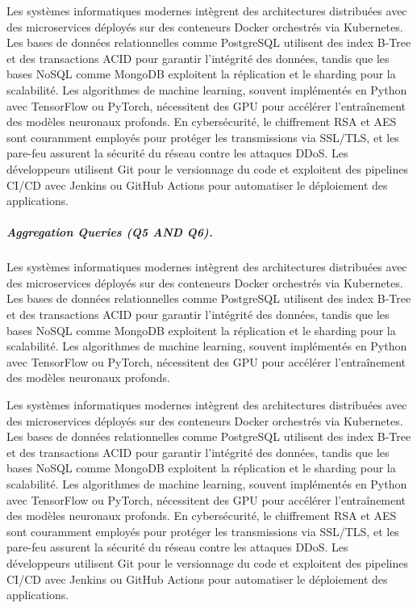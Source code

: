



Les systèmes informatiques modernes intègrent des architectures distribuées avec des microservices déployés sur des conteneurs Docker orchestrés via Kubernetes. Les bases de données relationnelles comme PostgreSQL utilisent des index B-Tree et des transactions ACID pour garantir l'intégrité des données, tandis que les bases NoSQL comme MongoDB exploitent la réplication et le sharding pour la scalabilité. Les algorithmes de machine learning, souvent implémentés en Python avec TensorFlow ou PyTorch, nécessitent des GPU pour accélérer l'entraînement des modèles neuronaux profonds. En cybersécurité, le chiffrement RSA et AES sont couramment employés pour protéger les transmissions via SSL/TLS, et les pare-feu assurent la sécurité du réseau contre les attaques DDoS. Les développeurs utilisent Git pour le versionnage du code et exploitent des pipelines CI/CD avec Jenkins ou GitHub Actions pour automatiser le déploiement des applications.

\subparagraph{Aggregation Queries (Q5 AND Q6).}
Les systèmes informatiques modernes intègrent des architectures distribuées avec des microservices déployés sur des conteneurs Docker orchestrés via Kubernetes. Les bases de données relationnelles comme PostgreSQL utilisent des index B-Tree et des transactions ACID pour garantir l'intégrité des données, tandis que les bases NoSQL comme MongoDB exploitent la réplication et le sharding pour la scalabilité. Les algorithmes de machine learning, souvent implémentés en Python avec TensorFlow ou PyTorch, nécessitent des GPU pour accélérer l'entraînement des modèles neuronaux profonds.

Les systèmes informatiques modernes intègrent des architectures distribuées avec des microservices déployés sur des conteneurs Docker orchestrés via Kubernetes. Les bases de données relationnelles comme PostgreSQL utilisent des index B-Tree et des transactions ACID pour garantir l'intégrité des données, tandis que les bases NoSQL comme MongoDB exploitent la réplication et le sharding pour la scalabilité. Les algorithmes de machine learning, souvent implémentés en Python avec TensorFlow ou PyTorch, nécessitent des GPU pour accélérer l'entraînement des modèles neuronaux profonds. En cybersécurité, le chiffrement RSA et AES sont couramment employés pour protéger les transmissions via SSL/TLS, et les pare-feu assurent la sécurité du réseau contre les attaques DDoS. Les développeurs utilisent Git pour le versionnage du code et exploitent des pipelines CI/CD avec Jenkins ou GitHub Actions pour automatiser le déploiement des applications.

